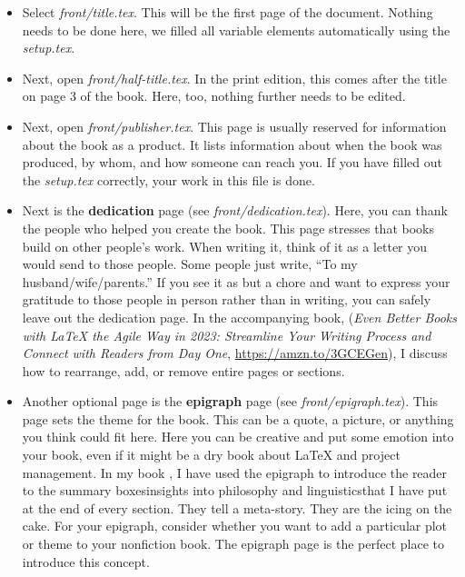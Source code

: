 \begin{itemize}
    \item Select \textit{front/title.tex}. This will be the first page of the document. Nothing needs to be done here, we filled all variable elements automatically using the \textit{setup.tex}.

    \item Next, open \textit{front/half-title.tex}. In the print edition, this comes after the title on page 3 of the book. Here, too, nothing further needs to be edited.

    \item Next, open \textit{front/publisher.tex}. This page is usually reserved for information about the book as a product. It lists information about when the book was produced, by whom, and how someone can reach you. If you have filled out the \textit{setup.tex} correctly, your work in this file is done.

    \item Next is the \textbf{dedication} page (see \textit{front/dedication.tex}). Here, you can thank the people who helped you create the book. This page stresses that books build on other people's work. When writing it, think of it as a letter you would send to those people. Some people just write, ``To my husband/wife/parents.'' If you see it as but a chore and want to express your gratitude to those people in person rather than in writing, you can safely leave out the dedication page. In the accompanying book, (\textit{Even Better Books with LaTeX the Agile Way in 2023: Streamline Your Writing Process and Connect with Readers from Day One}, \url{https://amzn.to/3GCEGen}), I discuss how to rearrange, add, or remove entire pages or sections.


    
    \item Another optional page is the \textbf{epigraph} page (see \textit{front/epigraph.tex}). This page sets the theme for the book. This can be a quote, a picture, or anything you think could fit here. Here you can be creative and put some emotion into your book, even if it might be a dry book about LaTeX and project management. In my book , I have used the epigraph to introduce the reader to the summary boxes\emdash{}insights into philosophy and linguistics\emdash{}that I have put at the end of every section. They tell a meta-story. They are the icing on the cake. For your epigraph, consider whether you want to add a particular plot or theme to your nonfiction book. The epigraph page is the perfect place to introduce this concept.


\end{itemize}
